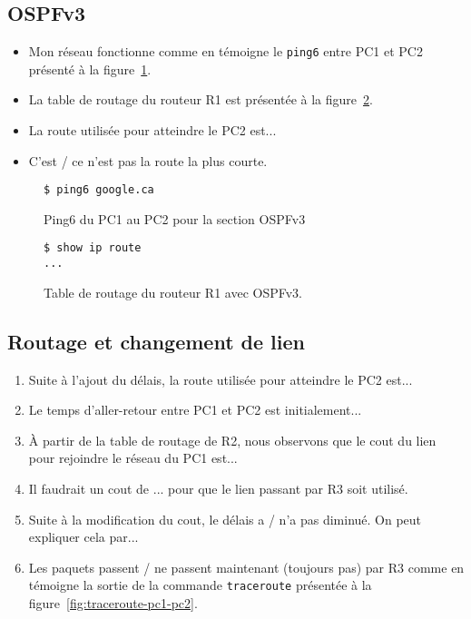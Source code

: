 \documentclass[]{article}
\begin{document}
\subsection*{OSPFv3}

\begin{itemize}
      \item  Mon réseau fonctionne comme en témoigne le \texttt{ping6} entre PC1 et PC2
             présenté à la figure~\ref{fig:ping6-pc1-pc2-ospfv2}.
      \item  La table de routage du routeur R1 est présentée à la figure~\ref{fig:ospfv3-routes-r1}.
      \item  La route utilisée pour atteindre le PC2 est...
      \item  C'est / ce n'est pas la route la plus courte.
\end{itemize}


\begin{figure} 
      \centering
      \begin{lstlisting}
$ ping6 google.ca
      \end{lstlisting}
      \caption[]{Ping6 du PC1 au PC2 pour la section OSPFv3}
      \label{fig:ping6-pc1-pc2-ospfv2}
\end{figure}


\begin{figure} 
      \centering
      \begin{lstlisting}
$ show ip route
...
      \end{lstlisting}
      \caption[]{Table de routage du routeur R1 avec OSPFv3.}
      \label{fig:ospfv3-routes-r1}
\end{figure}


\subsection*{Routage et changement de lien}

\begin{enumerate}
      \item  Suite à l'ajout du délais, la route utilisée pour atteindre le PC2 est...
      \item Le temps d'aller-retour entre PC1 et PC2 est initialement...
      \item À partir de la table de routage de R2, nous observons que le cout du lien pour rejoindre 
            le réseau du PC1 est...
      \item Il faudrait un cout de ... pour que le lien passant par R3 soit utilisé.
      \item Suite à la modification du cout, le délais a / n'a pas diminué. On peut expliquer cela par...
      \item Les paquets passent / ne passent maintenant (toujours pas) par R3 comme en témoigne la sortie
            de la commande \texttt{traceroute} présentée à la figure~\ref{fig:traceroute-pc1-pc2}.
\end{enumerate}
\end{document}

